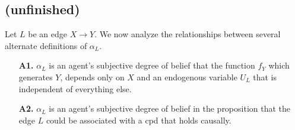 \documentclass{article}
\newcommand{\E}{\mathop{\mathbb E}}
\theoremstyle{plain}
\newtheorem{claim}[theorem]{Claim}
\theoremstyle{definition}
\theoremstyle{remark}
\newcommand{\cdo}{\mathop{\mathrm{do}}}
\newcommand{\evt}[2]{#1\!\!=\!#2}
\begin{document}
\subsection{(unfinished)}
Let $L$ be an edge $X \to Y$. We now analyze the relationships between several alternate definitions of $\alpha_L$.

\begin{itemize}
	\item[\textbf{A1.}] $\alpha_L$ is an agent's subjective degree of belief that the function $f_Y$ which generates $Y$, depends only on $X$ and an endogenous variable $U_L$ that is independent of everything else.
	\item[\textbf{A2.}] $\alpha_L$ is an agent's subjective degree of belief in the proposition that the edge $L$ could be associated with a cpd that holds causally.
\end{itemize}




%
%
%
%
%
%
%
%
%
%
%
%
\end{document}

